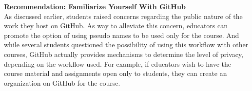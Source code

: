 



\textbf{Recommendation: Familiarize Yourself With GitHub}\\
As discussed earlier, students raised concerns regarding the public nature of the work they host on GitHub. As way to alleviate this concern, educators can promote the option of using pseudo names to be used only for the course. And while several students questioned the possibility of using this workflow with other courses, GitHub actually provides mechanisms to determine the level of privacy, depending on the workflow used. For example, if educators wish to have the course material and assignments open only to students, they can create an organization on GitHub for the course.

